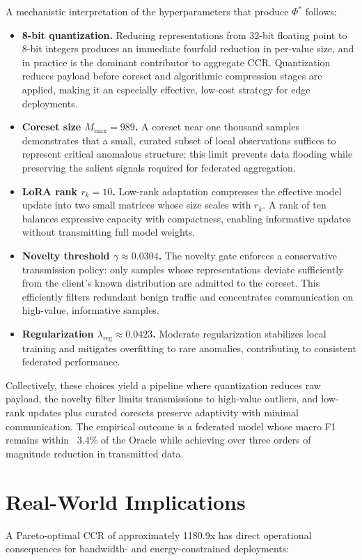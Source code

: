 A mechanistic interpretation of the hyperparameters that produce $\Phi^*$ follows:

\begin{itemize}
\item \textbf{8-bit quantization.} Reducing representations from 32-bit floating point to 8-bit integers produces an immediate fourfold reduction in per-value size, and in practice is the dominant contributor to aggregate CCR. Quantization reduces payload before coreset and algorithmic compression stages are applied, making it an especially effective, low-cost strategy for edge deployments.
\item \textbf{Coreset size $M_{\max} = 989$.} A coreset near one thousand samples demonstrates that a small, curated subset of local observations suffices to represent critical anomalous structure; this limit prevents data flooding while preserving the salient signals required for federated aggregation.
\item \textbf{LoRA rank $r_k = 10$.} Low-rank adaptation compresses the effective model update into two small matrices whose size scales with $r_k$. A rank of ten balances expressive capacity with compactness, enabling informative updates without transmitting full model weights.
\item \textbf{Novelty threshold $\gamma \approx 0.0304$.} The novelty gate enforces a conservative transmission policy: only samples whose representations deviate sufficiently from the client's known distribution are admitted to the coreset. This efficiently filters redundant benign traffic and concentrates communication on high-value, informative samples.
\item \textbf{Regularization $\lambda_{\text{reg}} \approx 0.0423$.} Moderate regularization stabilizes local training and mitigates overfitting to rare anomalies, contributing to consistent federated performance.
\end{itemize}

Collectively, these choices yield a pipeline where quantization reduces raw payload, the novelty filter limits transmissions to high-value outliers, and low-rank updates plus curated coresets preserve adaptivity with minimal communication. The empirical outcome is a federated model whose macro F1 remains within ~3.4\% of the Oracle while achieving over three orders of magnitude reduction in transmitted data.

\section{Real-World Implications}
A Pareto-optimal CCR of approximately 1180.9x has direct operational consequences for bandwidth- and energy-constrained deployments:


